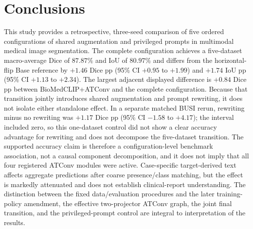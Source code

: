\section{Conclusions}
This study provides a retrospective, three-seed comparison of five ordered
configurations of shared augmentation and privileged prompts in multimodal
medical image segmentation. The complete configuration achieves a five-dataset
macro-average Dice of $87.87\%$ and IoU of $80.97\%$ and
differs from the horizontal-flip Base reference by $+1.46$ Dice pp (95\% CI $+0.95$ to
$+1.99$) and $+1.74$ IoU pp (95\% CI $+1.13$ to $+2.34$). The largest adjacent
displayed difference is $+0.84$ Dice pp between BioMedCLIP+ATConv and the complete
configuration. Because that transition jointly introduces shared augmentation and
prompt rewriting, it does not isolate either standalone effect. In a separate
matched BUSI rerun, rewriting minus no rewriting was $+1.17$ Dice pp (95\% CI
$-1.58$ to $+4.17$); the interval included zero, so this one-dataset control did
not show a clear accuracy advantage for rewriting and does not decompose the
five-dataset transition. The supported
accuracy claim is therefore a configuration-level benchmark association, not a
causal component decomposition, and it does not imply that all four registered
ATConv modules were active.
Case-specific target-derived text affects aggregate predictions after coarse
presence/class matching, but the effect is markedly attenuated and does not
establish clinical-report understanding. The distinction between the fixed
data/evaluation procedures and the later training-policy amendment, the effective
two-projector ATConv graph, the joint final transition, and the
privileged-prompt control are integral to interpretation of the results.
